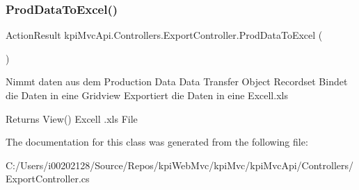 \subsubsection{\texorpdfstring{Prod\+Data\+To\+Excel()}{ProdDataToExcel()}}
{\footnotesize\ttfamily Action\+Result kpi\+Mvc\+Api.\+Controllers.\+Export\+Controller.\+Prod\+Data\+To\+Excel (\begin{DoxyParamCaption}{ }\end{DoxyParamCaption})\hspace{0.3cm}{\ttfamily [inline]}}



Nimmt daten aus dem Production Data Data Transfer Object Recordset Bindet die Daten in eine Gridview Exportiert die Daten in eine Excell.\+xls 

\begin{DoxyReturn}{Returns}
View() Excell .xls File 
\end{DoxyReturn}


The documentation for this class was generated from the following file\+:\begin{DoxyCompactItemize}
\item 
C\+:/\+Users/i00202128/\+Source/\+Repos/kpi\+Web\+Mvc/kpi\+Mvc/kpi\+Mvc\+Api/\+Controllers/Export\+Controller.\+cs\end{DoxyCompactItemize}
